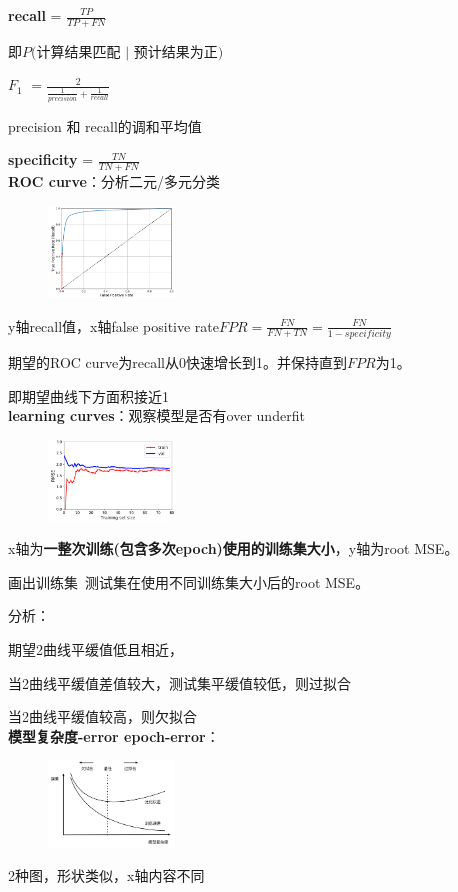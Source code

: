 \documentclass[UTF8]{ctexart}
\begin{document}
  \textbf{recall} = $\frac{TP}{TP + FN}$

  \quad 即$P($计算结果匹配 $|$ 预计结果为正$)$

  \textbf{$F_1$} $= \frac{2}{\frac{1}{precision} + \frac{1}{recall}}$ 
  
  \quad precision 和 recall的调和平均值
  
  \textbf{specificity} = $\frac{TN}{TN + FN}$\\
\textbf{ROC curve}：分析二元/多元分类

  \begin{figure}[H] %
    \centering %
    \includegraphics[width=0.3\textwidth]{note_images/ROC_curve.png} %
  \end{figure}

  y轴recall值，x轴false positive rate$FPR = \frac{FN}{FN + TN} = \frac{FN}{1-specificity}$

  期望的ROC curve为recall从0快速增长到1。并保持直到$FPR$为1。
  
  \quad 即期望曲线下方面积接近1\\
\textbf{learning curves}：观察模型是否有over underfit

  \begin{figure}[H] %
    \centering %
    \includegraphics[width=0.3\textwidth]{note_images/learning_curve.png} %
  \end{figure}

  x轴为\textbf{一整次训练(包含多次epoch)使用的训练集大小}，y轴为root MSE。

  画出训练集\ 测试集在使用不同训练集大小后的root MSE。

  分析：

  \quad 期望2曲线平缓值低且相近，

  \quad 当2曲线平缓值差值较大，测试集平缓值较低，则过拟合

  \quad 当2曲线平缓值较高，则欠拟合\\
\textbf{模型复杂度-error epoch-error}：

  \begin{figure}[H] %
    \centering %
    \includegraphics[width=0.3\textwidth]{note_images/epoch-complex-error.png} %
  \end{figure}

  2种图，形状类似，x轴内容不同\\
\end{document}

